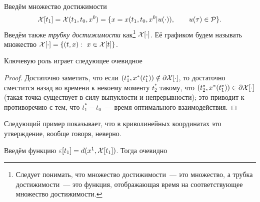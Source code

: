 Введём множество достижимости 
\begin{equation*}
  \mathcal{X}[t_1] = \mathcal{X}(t_1, t_0, x^0) = \{x = x(t_1, t_0, x^0 | u(\cdot)),
  \qquad u(\tau) \in \mathcal{P}\}.
\end{equation*}
Введём также \emph{трубку достижимости}
как\footnote{Следует понимать,
что множество достижимости~--- это множество,
а трубка достижимости~--- это функция,
отображающая время на соответствующее
множество достижимости.} $\mathcal{X}[\cdot]$.
Её графиком будем называть
множество $\soa[\cdot] = \{(t, x) : \ x\in\soa[t]\}$.

Ключевую роль играет следующее очевидное
{
}
\begin{proof}
  Достаточно заметить,
  что если $(t_1^*, x^*(t_1^*)) \notin \partial\mathcal{X}[\cdot]$,
  то достаточно сместится назад во времени к
  некоему моменту $t_2^*$ такому,
  что $(t_2^*, x^*(t_1^*)) \in \partial\mathcal{X}[\cdot]$
  (такая точка существует в силу выпуклости и непрерывности);
  это приводит к противоречию с тем,
  что $t_1^* - t_0$~--- время оптимального взаимодействия.
\end{proof}

Следующий пример показывает,
что в криволинейных координатах это утверждение,
вообще говоря, неверно.


Введём функцию $\varepsilon[t_1] = d(x^1, \mathcal{X}[t_1])$.
Тогда очевидно
{
}

